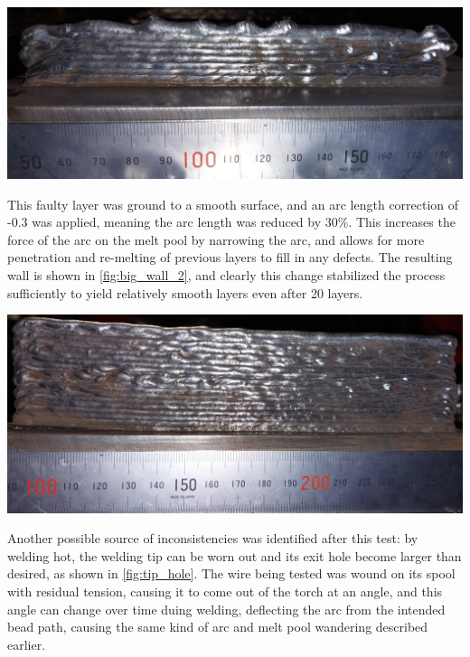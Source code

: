 \begin{minipage}{\linewidth}
    \centering
    \includegraphics[width=\linewidth]{images/big_wall_1.jpg}
    \label{fig:big_wall_1}
\end{minipage}

This faulty layer was ground to a smooth surface, and an arc length correction of -0.3 was applied, meaning the arc length was reduced by 30\%. This increases the force of the arc on the melt pool by narrowing the arc, and allows for more penetration and re-melting of previous layers to fill in any defects. The resulting wall is shown in \autoref{fig:big_wall_2}, and clearly this change stabilized the process sufficiently to yield relatively smooth layers even after 20 layers.

\begin{minipage}{\linewidth}
    \centering
    \includegraphics[width=\linewidth]{images/big_wall_2.jpg}
    \label{fig:big_wall_2}
\end{minipage}

Another possible source of inconsistencies was identified after this test: by welding hot, the welding tip can be worn out and its exit hole become larger than desired, as shown in \autoref{fig:tip_hole}. The wire being tested was wound on its spool with residual tension, causing it to come out of the torch at an angle, and this angle can change over time duing welding, deflecting the arc from the intended bead path, causing the same kind of arc and melt pool wandering described earlier.

